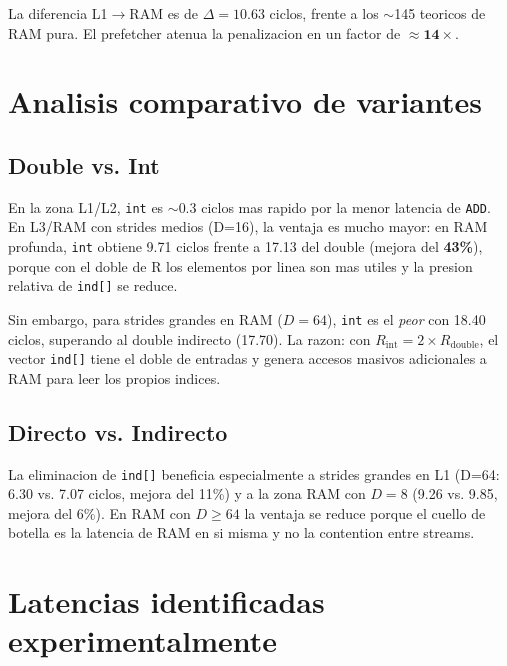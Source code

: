 \documentclass[12pt,a4paper]{article}
\begin{document}
La diferencia L1$\to$RAM es de $\Delta = 10.63$ ciclos, frente a los $\sim$145 teoricos de RAM pura. El prefetcher atenua la penalizacion en un factor de $\approx \mathbf{14\times}$.

\section{Analisis comparativo de variantes}

\subsection{Double vs. Int}

En la zona L1/L2, \texttt{int} es $\sim$0.3 ciclos mas rapido por la menor latencia de \texttt{ADD}. En L3/RAM con strides medios (D=16), la ventaja es mucho mayor: en RAM profunda, \texttt{int} obtiene 9.71 ciclos frente a 17.13 del double (mejora del \textbf{43\%}), porque con el doble de R los elementos por linea son mas utiles y la presion relativa de \texttt{ind[]} se reduce.

Sin embargo, para strides grandes en RAM ($D=64$), \texttt{int} es el \emph{peor} con 18.40 ciclos, superando al double indirecto (17.70). La razon: con $R_{\text{int}} = 2 \times R_{\text{double}}$, el vector \texttt{ind[]} tiene el doble de entradas y genera accesos masivos adicionales a RAM para leer los propios indices.

\subsection{Directo vs. Indirecto}

La eliminacion de \texttt{ind[]} beneficia especialmente a strides grandes en L1 (D=64: 6.30 vs. 7.07 ciclos, mejora del 11\%) y a la zona RAM con $D=8$ (9.26 vs. 9.85, mejora del 6\%). En RAM con $D \geq 64$ la ventaja se reduce porque el cuello de botella es la latencia de RAM en si misma y no la contention entre streams.

\section{Latencias identificadas experimentalmente}
\end{document}
